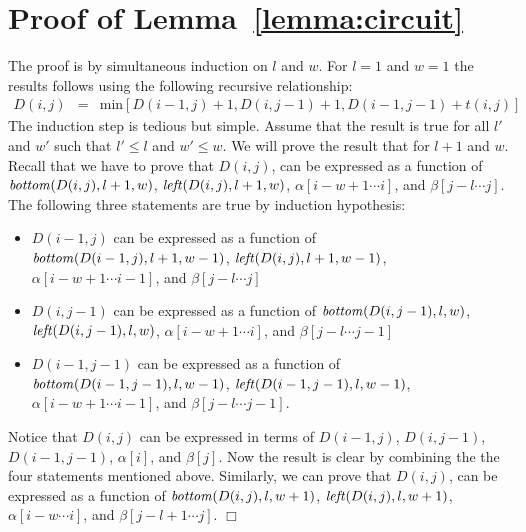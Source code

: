 \section{Proof of Lemma~\ref{lemma:circuit}}
\label{appendix:lemma}

The proof is by simultaneous induction on $l$ and $w$. For $l=1$ and
$w=1$ the results follows using the following recursive relationship:
\begin{eqnarray*}
D(i,j) & = & \mbox{min} [ D(i-1,j) + 1, D(i,j-1)+1, D(i-1,j-1)+t(i,j) ]
\end{eqnarray*}
The induction step is tedious but simple. Assume that the result is true for all $l'$ and $w'$ such that $l' \leq l$ and
$w' \leq w$.  We will prove the result that for $l+1$ and $w$. Recall that
we have to prove that $D(i,j)$, can be expressed as a function of ${\it
bottom}(D(i,j),l+1,w)$, ${\it left}(D(i,j),l+1,w)$, $ \alpha [ i-w+1
\cdots i ]$, and $\beta [ j-l \cdots j]$.  The following three statements are true
by induction hypothesis:
\begin{itemize}
\item $D(i-1,j)$ can be expressed as a function of ${\it
bottom}(D(i-1,j),l+1,w-1)$, ${\it left}(D(i,j),l+1,w-1)$, $ \alpha [ i-w+1
\cdots i-1 ]$, and $\beta [ j-l \cdots j]$

\item $D(i,j-1)$ can be expressed as a function of ${\it
bottom}(D(i,j-1),l,w)$, ${\it left}(D(i,j-1),l,w)$, $ \alpha [ i-w+1
\cdots i ]$, and $\beta [ j-l \cdots j-1]$

\item $D(i-1,j-1)$ can be expressed as a function of ${\it
bottom}(D(i-1,j-1),l,w-1)$, ${\it left}(D(i-1,j-1),l,w-1)$, $ \alpha [ i-w+1
\cdots i-1 ]$, and $\beta [ j-l \cdots j-1]$.
\end{itemize}
Notice that $D(i,j)$
can be expressed in terms of $D(i-1,j)$, $D(i,j-1)$, $D(i-1,j-1)$, 
$\alpha[i]$,  and $\beta[j]$. Now the result is clear by combining the
the four statements mentioned above. Similarly, we can prove that $D(i,j)$, can be expressed as a function of ${\it
bottom}(D(i,j),l,w+1)$, ${\it left}(D(i,j),l,w+1)$, $ \alpha [ i-w
\cdots i ]$, and $\beta [ j-l+1 \cdots j]$. $\Box$
